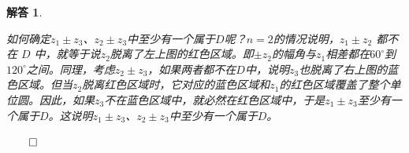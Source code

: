 \documentclass[12pt,UTF8,fontset=none]{ctexbook}
\theoremstyle{exercisestyle}
\theoremstyle{solutionstyle}
\newtheorem*{solution*}{解答}
\newenvironment{solution}
  {\begin{solution*}}
  {\hfill\ensuremath{\qed}\end{solution*}}
\begin{document}
\begin{solution}
\begin{subquestions}
\begin{enumerate}[label=\arabic*.]
\begin{minipage}[t]{0.4\textwidth}
\end{minipage}

如何确定\( z_1 \pm z_3 \)、\( z_2 \pm z_3 \)中至少有一个属于$D$呢？$n=2$的情况说明，\( z_1 \pm z_2 \) 都不在 \( D \) 中，就等于说$z_2$脱离了左上图的红色区域。即$\pm z_2$的幅角与$z_1$相差都在$60^\circ$到$120^\circ$之间。同理，考虑\( z_2 \pm z_3 \)，如果两者都不在$D$中，说明$z_3$也脱离了右上图的蓝色区域。但当$z_2$脱离红色区域时，它对应的蓝色区域和$z_1$的红色区域覆盖了整个单位圆。因此，如果$z_3$不在蓝色区域中，就必然在红色区域中，于是\( z_1 \pm z_3 \)至少有一个属于$D$。这说明\( z_1 \pm z_3 \)、\( z_2 \pm z_3 \)中至少有一个属于$D$。


\end{enumerate}
\end{subquestions}
\end{solution}
\end{document}
